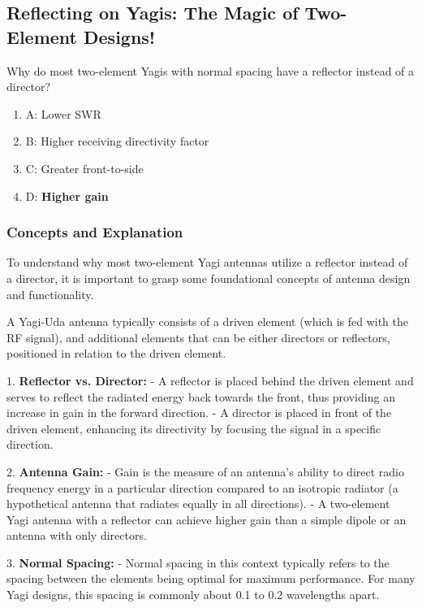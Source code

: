 \subsection{Reflecting on Yagis: The Magic of Two-Element Designs!}

\begin{tcolorbox}[colback=gray!10, colframe=black, title=E9D11]
Why do most two-element Yagis with normal spacing have a reflector instead of a director? 

\begin{enumerate}[label=\Alph*)]
    \item A: Lower SWR
    \item B: Higher receiving directivity factor
    \item C: Greater front-to-side
    \item D: \textbf{Higher gain}
\end{enumerate} \end{tcolorbox}

\subsubsection{Concepts and Explanation}

To understand why most two-element Yagi antennas utilize a reflector instead of a director, it is important to grasp some foundational concepts of antenna design and functionality. 

A Yagi-Uda antenna typically consists of a driven element (which is fed with the RF signal), and additional elements that can be either directors or reflectors, positioned in relation to the driven element. 

1. \textbf{Reflector vs. Director:} 
   - A reflector is placed behind the driven element and serves to reflect the radiated energy back towards the front, thus providing an increase in gain in the forward direction. 
   - A director is placed in front of the driven element, enhancing its directivity by focusing the signal in a specific direction. 

2. \textbf{Antenna Gain:} 
   - Gain is the measure of an antenna's ability to direct radio frequency energy in a particular direction compared to an isotropic radiator (a hypothetical antenna that radiates equally in all directions).
   - A two-element Yagi antenna with a reflector can achieve higher gain than a simple dipole or an antenna with only directors.

3. \textbf{Normal Spacing:} 
   - Normal spacing in this context typically refers to the spacing between the elements being optimal for maximum performance. For many Yagi designs, this spacing is commonly about 0.1 to 0.2 wavelengths apart.

